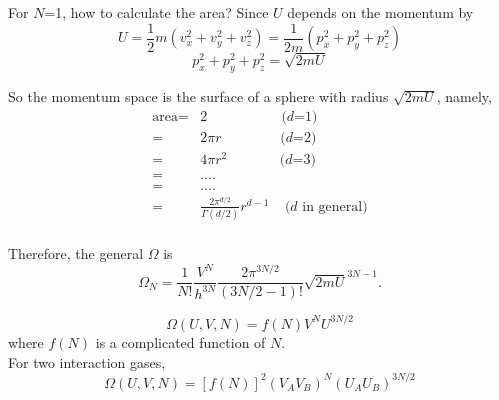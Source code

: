 \documentclass[twoside]{article}
\begin{document}
For $N$=1, how to calculate the area?
Since $U$ depends on the momentum by
\begin{equation}
U = \frac{1}{2}m(v_x^2+v_y^2+v_z^2)=\frac{1}{2m}(p_x^2+p_y^2+p_z^2)
\end{equation}
\begin{equation}
p_x^2+p_y^2+p_z^2 = \sqrt{2mU}
\end{equation}

So the momentum space is the surface of a sphere with radius $\sqrt{2mU}$, namely,
\begin{equation}
\begin{split}
\text{area} = & 2    ~~~~~~~~~~~~~~~~~~~~~~~~\text {($d$=1)}\\
            = & 2\pi r    ~~~~~~~~~~~~~~~~~~~\text {($d$=2)}\\
            = & 4\pi r^2    ~~~~~~~~~~~~~~~~~\text {($d$=3)}\\
            = & ....\\
            = & ....\\
            = & \frac{2\pi^{d/2}}{\Gamma(d/2)} r^{d-1} ~~~~~\text {($d$ in general)}\\
\end{split}
\end{equation}

Therefore, the general $\Omega$ is
\begin{equation} 
\Omega_N = \frac{1}{N!} \frac{V^N}{h^{3N}} \frac{2\pi^{3N/2}}{(3N/2-1)!} \sqrt{2mU}^{3N-1}. 
\end{equation}


\begin{equation}
\Omega(U,V,N) = f(N)V^NU^{3N/2}
\end{equation}
where $f(N)$ is a complicated function of $N$.\\

For two interaction gases,
\begin{equation}
\Omega(U,V,N) = [f(N)]^2(V_AV_B)^N(U_AU_B)^{3N/2}
\end{equation}
\end{document}
